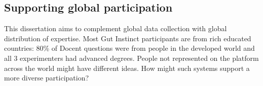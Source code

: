

%
%

\subsection{Supporting global participation}
This dissertation aims to complement global data collection with global distribution of expertise. Most Gut Instinct participants are from rich educated countries: 80\% of Docent questions were from people in the developed world and all 3 experimenters had advanced degrees. People not represented on the platform across the world might have different ideas. How might such systems support a more diverse participation?

